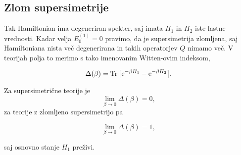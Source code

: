 \subsection{Zlom supersimetrije}

Tak Hamiltonian ima degeneriran spekter, saj imata $H_1$ in $H_2$ iste lastne vrednosti. Kadar velja
$E^{(1)}_0 = 0$ pravimo, da je supersimetrija zlomljena, saj Hamiltoniana nista ve\v c degenerirana
in takih operatorjev $Q$ nimamo ve\v c. V teorijah polja to merimo s tako imenovanim Witten-ovim
indeksom,

\begin{equation}
	\Delta (\beta) = \operatorname{Tr}\big[\text{e}^{-\beta H_1} - \text{e}^{-\beta H_2}\big].
\end{equation}

Za supersimetri\v cne teorije je 
\begin{equation}
	\lim_{\beta \to 0} \Delta(\beta) = 0,
\end{equation}
za teorije z zlomljeno supersimetrijo pa 

\begin{equation}
	\lim_{\beta \to 0} \Delta (\beta) = 1,
\end{equation}

saj osnovno stanje $H_1$ pre\v zivi.

